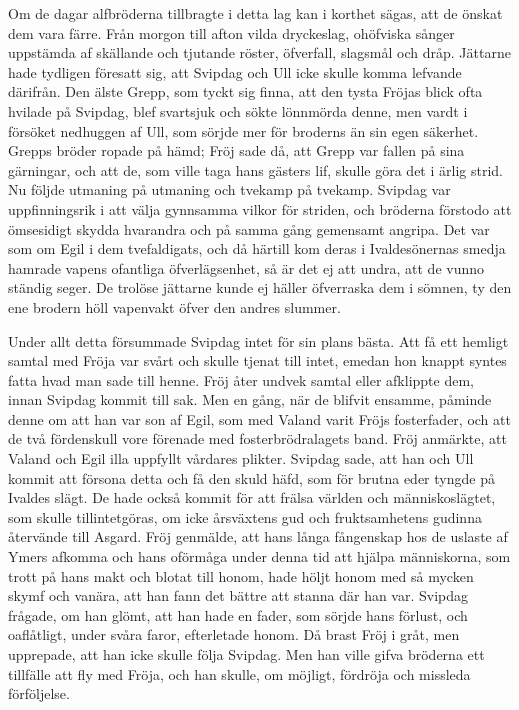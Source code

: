 Om de dagar alfbröderna tillbragte i detta lag kan i korthet sägas, att
de önskat dem vara färre. Från morgon till afton vilda dryckeslag,
ohöfviska sånger uppstämda af skällande och tjutande röster, öfverfall,
slagsmål och dråp.
\protect\hypertarget{lb1625905.xhtmlux5cux23start109}{}{}\protect\hypertarget{lb1625905.xhtmlux5cux23start109-a}{}{}\protect\hypertarget{lb1625905.xhtmlux5cux23start109-b}{}{}\protect\hypertarget{lb1625905.xhtmlux5cux23start109-c}{}{}\protect\hypertarget{lb1625905.xhtmlux5cux23start109-d}{}{}
Jättarne hade tydligen föresatt sig, att Svipdag och Ull icke skulle
komma lefvande därifrån. Den älste Grepp, som tyckt sig finna, att den
tysta Fröjas blick ofta hvilade på Svipdag, blef svartsjuk och sökte
lönnmörda denne, men vardt i försöket nedhuggen af Ull, som sörjde mer
för broderns än sin egen säkerhet. Grepps bröder ropade på hämd; Fröj
sade då, att Grepp var fallen på sina gärningar, och att de, som ville
taga hans gästers lif, skulle göra det i ärlig strid. Nu följde utmaning
på utmaning och tvekamp på tvekamp. Svipdag var uppfinningsrik i att
välja gynnsamma vilkor för striden, och bröderna förstodo att ömsesidigt
skydda hvarandra och på samma gång gemensamt angripa. Det var som om
Egil i dem tvefaldigats, och då härtill kom deras i Ivaldesönernas
smedja hamrade vapens ofantliga öfverlägsenhet, så är det ej att undra,
att de vunno ständig seger. De trolöse jättarne kunde ej häller
öfverraska dem i sömnen, ty den ene brodern höll vapenvakt öfver den
andres slummer.

Under allt detta försummade Svipdag intet för sin plans bästa. Att få
ett hemligt samtal med Fröja var svårt och skulle tjenat till intet,
emedan hon knappt syntes fatta hvad man sade till henne. Fröj åter
undvek samtal eller afklippte dem, innan Svipdag kommit till sak. Men en
gång, när de blifvit ensamme, påminde denne om att han var son af Egil,
som med Valand varit Fröjs fosterfader, och att de två fördenskull vore
förenade med fosterbrödralagets band. Fröj anmärkte, att Valand och Egil
illa uppfyllt vårdares plikter. Svipdag sade, att han och Ull kommit att
försona detta och få den skuld häfd, som för brutna eder tyngde på
Ivaldes slägt. De hade också kommit för att frälsa världen och
människoslägtet, som skulle tillintetgöras, om icke årsväxtens gud och
fruktsamhetens gudinna återvände till Asgard. Fröj genmälde, att hans
långa fångenskap hos de uslaste af Ymers afkomma och hans oförmåga under
denna tid att hjälpa människorna, som trott på hans makt och blotat till
honom, hade höljt honom med så mycken skymf och vanära, att han fann det
bättre att stanna där han var. Svipdag frågade, om han
\protect\hypertarget{lb1625905.xhtmlux5cux23start110}{}{}\protect\hypertarget{lb1625905.xhtmlux5cux23start110-a}{}{}\protect\hypertarget{lb1625905.xhtmlux5cux23start110-b}{}{}\protect\hypertarget{lb1625905.xhtmlux5cux23start110-c}{}{}\protect\hypertarget{lb1625905.xhtmlux5cux23start110-d}{}{}
glömt, att han hade en fader, som sörjde hans förlust, och oaflåtligt,
under svåra faror, efterletade honom. Då brast Fröj i gråt, men
upprepade, att han icke skulle följa Svipdag. Men han ville gifva
bröderna ett tillfälle att fly med Fröja, och han skulle, om möjligt,
fördröja och missleda förföljelse.

